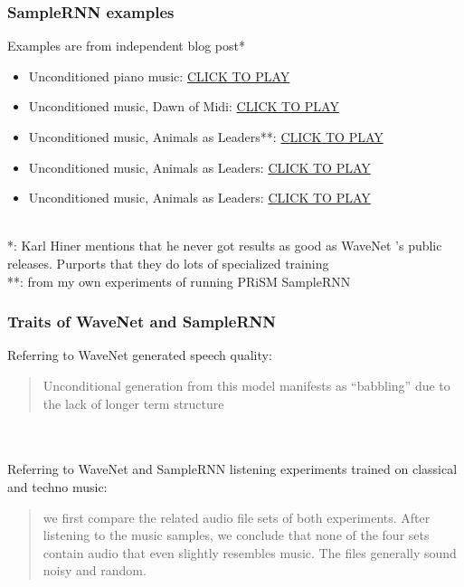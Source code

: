 \documentclass{beamer}
\begin{document}
\begin{frame}
	\frametitle{SampleRNN examples}
	Examples are from independent blog post*
	\begin{itemize}
		\item
			Unconditioned piano music: \href{run:./samplernn_sample_2.mp3}{CLICK TO PLAY}
		\item
			Unconditioned music, Dawn of Midi: \href{run:./samplernn_sample_1.mp3}{CLICK TO PLAY}
		\item
			Unconditioned music, Animals as Leaders**: \href{run:./aamgen_epoch_45.wav}{CLICK TO PLAY}
		\item
			Unconditioned music, Animals as Leaders: \href{run:./aamgen_epoch_75.wav}{CLICK TO PLAY}
		\item
			Unconditioned music, Animals as Leaders: \href{run:./aamgen_epoch_80.wav}{CLICK TO PLAY}
	\end{itemize}\ \\
	\vspace{1em}
	*: Karl Hiner mentions that he never got results as good as WaveNet 's public releases. Purports that they do lots of specialized training\\
	**: from my own experiments of running PRiSM SampleRNN
\end{frame}


\begin{frame}
	\frametitle{Traits of WaveNet and SampleRNN}
	Referring to WaveNet generated speech quality:
	\begin{quote}
		Unconditional generation from this model manifests as ``babbling'' due to the lack of longer term structure
	\end{quote}\\\ \\
	Referring to WaveNet and SampleRNN listening experiments trained on classical and techno music:
	\begin{quote}
		we first compare the related audio file sets of both experiments. After listening to the music samples, we conclude that none of the four sets contain audio that even slightly resembles music. The files generally sound noisy and random.
	\end{quote}
\end{frame}
\end{document}
